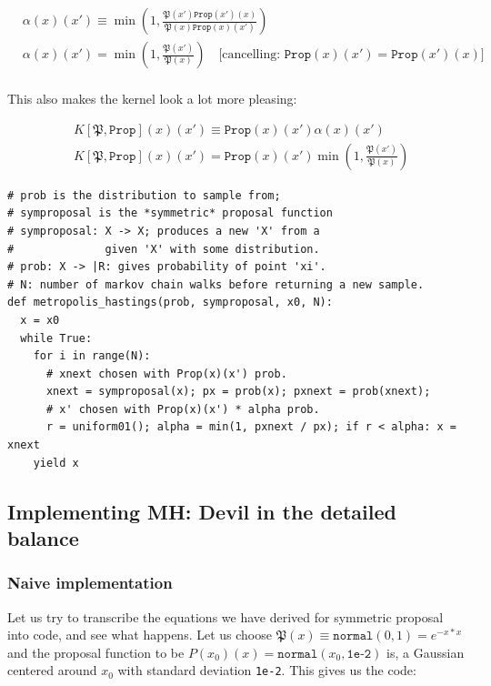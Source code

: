 \documentclass[titlepage]{article}
\renewcommand{\P}{\mathfrak{P}}
\newcommand{\Prop}{\texttt{Prop}}
\begin{document}
\begin{align*}
&\alpha(x)(x') \equiv   \min\left(1, \frac{\P(x')\Prop(x')(x)}{\P(x)\Prop(x)(x')} \right) \\
&\alpha(x)(x') = \min\left(1, \frac{\P(x')}{\P(x)} \right) \quad \text{[cancelling: $\Prop(x)(x') = \Prop(x')(x)$]}\\ 
\end{align*}

This also makes the kernel look a lot more pleasing:

\begin{align*}
&K[\P, \Prop](x)(x') \equiv \Prop(x)(x') \alpha(x)(x') \\
&K[\P, \Prop](x)(x') = \Prop(x)(x') \min\left(1, \frac{\P(x')}{\P(x)} \right) 
\end{align*}

\newpage

{\footnotesize
\begin{verbatim}
# prob is the distribution to sample from;
# symproposal is the *symmetric* proposal function
# symproposal: X -> X; produces a new 'X' from a 
#              given 'X' with some distribution.
# prob: X -> |R: gives probability of point 'xi'.
# N: number of markov chain walks before returning a new sample.
def metropolis_hastings(prob, symproposal, x0, N):
  x = x0
  while True:
    for i in range(N):
      # xnext chosen with Prop(x)(x') prob.
      xnext = symproposal(x); px = prob(x); pxnext = prob(xnext);
      # x' chosen with Prop(x)(x') * alpha prob.
      r = uniform01(); alpha = min(1, pxnext / px); if r < alpha: x = xnext
    yield x
\end{verbatim}
}

\subsection{Implementing MH: Devil in the detailed balance}

\subsubsection{Naive implementation}

Let us try to transcribe the equations we have derived for symmetric proposal
into code, and see what happens. Let us choose $\P(x) \equiv \texttt{normal}(0, 1) = e^{-x*x}$
and the proposal function to be $P(x_0)(x) = \texttt{normal}(x_0, \texttt{1e-2})$
is, a Gaussian centered around $x_0$ with standard deviation \texttt{1e-2}.
This gives us the code:
\end{document}
